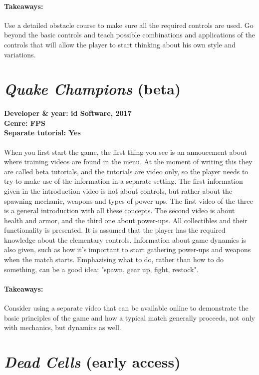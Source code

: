 \paragraph{Takeaways:}
Use a detailed obstacle course to make sure all the required controls are used.
Go beyond the basic controls and teach possible combinations and applications of the controls that will allow the player to start thinking about his own style and variations.

\section{\textit{Quake Champions }(beta)}
\paragraph{Developer \& year: id Software, 2017 \\ Genre: FPS \\ Separate tutorial: Yes \\}
When you first start the game, the first thing you see is an annoucement about
where training videos are found in the menu. At the moment of writing this
they are called beta tutorials, and the tutorials are video only, so the
player needs to try to make use of the information in a separate setting. The
first information given in the introduction video is not about controls, but
rather about the spawning mechanic, weapons and types of power-ups. The first
video of the three is a general introduction with all these concepts. The
second video is about health and armor, and the third one about power-ups.
All collectibles and their functionality is presented. It is assumed that the
player has the required knowledge about the elementary controls. Information about game dynamics is also given, such as how it's important to start gathering power-ups and weapons when the match starts. Emphazising what to do, rather than how to do something, can be a good idea: "spawn, gear up, fight, restock".
\paragraph{Takeaways:}
Consider using a separate video that can be available online to demonstrate the basic principles of the game and how a typical match generally proceeds, not only with mechanics, but dynamics as well.

\section{\textit{Dead Cells } (early access)}
